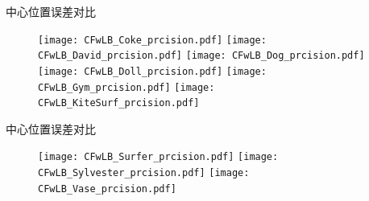 \begin{frame}{中心位置误差对比}
\begin{figure}[htbp]
\centering
\texttt{[image: CFwLB\_Coke\_prcision.pdf]}
\texttt{[image: CFwLB\_David\_prcision.pdf]}
\texttt{[image: CFwLB\_Dog\_prcision.pdf]}\\
\texttt{[image: CFwLB\_Doll\_prcision.pdf]}
\texttt{[image: CFwLB\_Gym\_prcision.pdf]}
\texttt{[image: CFwLB\_KiteSurf\_prcision.pdf]}
\end{figure}
\end{frame}
\begin{frame}{中心位置误差对比}
\begin{figure}[htbp]
\centering
\texttt{[image: CFwLB\_Surfer\_prcision.pdf]}
\texttt{[image: CFwLB\_Sylvester\_prcision.pdf]}
\texttt{[image: CFwLB\_Vase\_prcision.pdf]}
\end{figure}
\end{frame}

